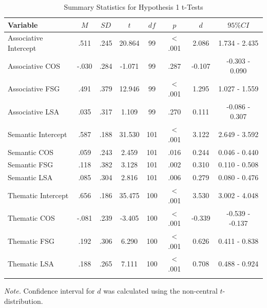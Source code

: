 \documentclass[english,,man]{apa6}
\begin{document}
\begin{table}[tbp]
\begin{center}
\begin{threeparttable}
\caption{\label{tab:hyp1-table1}Summary Statistics for Hypothesis 1 t-Tests}
\begin{tabular}{lccccccc}
\toprule
Variable & $M$ & $SD$ & $t$ & $df$ & $p$ & $d$ & $95\% CI$\\
\midrule
Associative Intercept & .511 & .245 & 20.864 & 99 & < .001 & 2.086 & 1.734 - 2.435\\
Associative COS & -.030 & .284 & -1.071 & 99 & .287 & -0.107 & -0.303 - 0.090\\
Associative FSG & .491 & .379 & 12.946 & 99 & < .001 & 1.295 & 1.027 - 1.559\\
Associative LSA & .035 & .317 & 1.109 & 99 & .270 & 0.111 & -0.086 - 0.307\\
Semantic Intercept & .587 & .188 & 31.530 & 101 & < .001 & 3.122 & 2.649 - 3.592\\
Semantic COS & .059 & .243 & 2.459 & 101 & .016 & 0.244 & 0.046 - 0.440\\
Semantic FSG & .118 & .382 & 3.128 & 101 & .002 & 0.310 & 0.110 - 0.508\\
Semantic LSA & .085 & .304 & 2.816 & 101 & .006 & 0.279 & 0.080 - 0.476\\
Thematic Intercept & .656 & .186 & 35.475 & 100 & < .001 & 3.530 & 3.002 - 4.048\\
Thematic COS & -.081 & .239 & -3.405 & 100 & < .001 & -0.339 & -0.539 - -0.137\\
Thematic FSG & .192 & .306 & 6.290 & 100 & < .001 & 0.626 & 0.411 - 0.838\\
Thematic LSA & .188 & .265 & 7.111 & 100 & < .001 & 0.708 & 0.488 - 0.924\\
\bottomrule
\addlinespace
\end{tabular}
\begin{tablenotes}[para]
\normalsize{\textit{Note.} Confidence interval for $d$ was calculated using the non-central $t$-distribution. }
\end{tablenotes}
\end{threeparttable}
\end{center}
\end{table}
\end{document}
